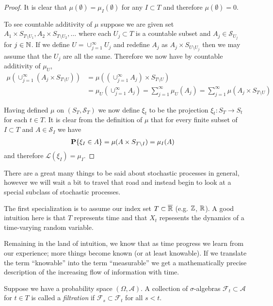 \begin{proof}
It is clear that $\mu(\emptyset) = \mu_I(\emptyset)$ for any $I
\subset T$ and therefore $\mu(\emptyset) = 0$.  

To see countable additivity of $\mu$ suppose we are given set $A_1
\times S_{T \setminus U_1}, A_2 \times S_{T \setminus U_2}, \dotsc$
where each $U_j \subset T$ is a countable subset and $A_j \in
\mathcal{S}_{U_j}$ for $j \in \mathbb{N}$.  If we define $U =
\cup_{j=1}^\infty U_j$ and redefine $A_j$ as $A_j \times S_{U
  \setminus U_j}$ then we may assume that the $U_j$ are all the same.
  Therefore we now have by countable additivity of $\mu_U$,
\begin{align*}
\mu(\cup_{j=1}^\infty (A_j \times S_{T\setminus U})) &=
\mu((\cup_{j=1}^\infty A_j) \times S_{T\setminus U}) \\
&=\mu_U(\cup_{j=1}^\infty A_j) = \sum_{j=1}^\infty \mu_U(A_j) =
\sum_{j=1}^\infty \mu(A_j \times S_{T \setminus U}) 
\end{align*}

Having defined $\mu$ on $(S_T, \mathcal{S}_T)$ we now define $\xi_t$
to be the projection $\xi_t : S_T \to S_t$ for each $t \in T$.  It is
clear from the definition of $\mu$ that for every finite subset of $I
\subset T$ and $A \in \mathcal{S}_I$ we have
\begin{align*}
\textbf{P}\{ \xi_I \in A\} &= \mu(A \times S_{T \setminus I}) = \mu_I(A)
\end{align*}
and therefore $\mathcal{L}(\xi_I) = \mu_I$.
\end{proof}

There are a great many things to be said about stochastic processes in
general, however we will wait a bit to travel that road and instead begin to
look at a special subclass of stochastic processes.

The first specialization is to assume our index set $T \subset \overline{\mathbb{R}}$ (e.g. $\mathbb{Z}$,
$\mathbb{R}$).  A good intuition here is that $T$ represents time and that
$X_t$ repsesents the dynamics of a time-varying random variable.

Remaining in the land of intuition, we know that as time progress we
learn from our experience; more things become known (or at least
knowable).  If we translate the term ``knowable'' into the term
``measurable'' we get a mathematically precise description of the
increasing flow of information with time.
\begin{defn}Suppose we have a probability space $(\Omega,
  \mathcal{A})$.  A collection of $\sigma$-algebras $\mathcal{F}_t
  \subset \mathcal{A}$ for $t
  \in T$ is called a \emph{filtration} if $\mathcal{F}_s \subset
  \mathcal{F}_t$ for all $s < t$.
\end{defn}

